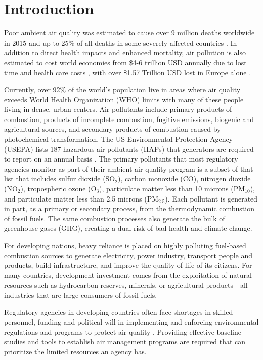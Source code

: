 \chapter{Introduction}

Poor ambient air quality was estimated to cause over 9 million deaths worldwide in 2015 and up to 25\% of all deaths in some severely affected countries \citep{Landrigan2017}. In addition to direct health impacts and enhanced mortality, air pollution is also estimated to cost world economies from \$4-6 trillion USD annually due to lost time and health care costs \citep{Landrigan2017, Narain2016}, with over \$1.57 Trillion USD lost in Europe alone \citep{Roy2015}.

Currently, over 92\% of the world's population live in areas where air quality exceeds World Health Organization (WHO) limits \citep{WHO2016} with many of these people living in dense, urban centers. Air pollutants include primary products of combustion, products of incomplete combustion, fugitive emissions, biogenic and agricultural sources, and secondary products of combustion caused by photochemical transformation. The US Environmental Protection Agency (USEPA) lists 187 hazardous air pollutants (HAPs) that generators are required to report on an annual basis \citep{USEPA2017}. The primary pollutants that most regulatory agencies monitor as part of their ambient air quality program is a subset of that list that includes sulfur dioxide (SO$_{2}$), carbon monoxide (CO), nitrogen dioxide (NO$_{2}$), tropospheric ozone (O$_{3}$),  particulate matter less than 10 microns (PM$_{10}$), and particulate matter less than 2.5 microns (PM$_{2.5}$). Each pollutant is generated in part, as a primary or secondary process, from the thermodynamic combustion of fossil fuels. The same combustion processes also generate the bulk of greenhouse gases (GHG), creating a dual risk of bad health and climate change.

For developing nations, heavy reliance is placed on highly polluting fuel-based combustion sources to generate electricity, power industry, transport people and products, build infrastructure, and improve the quality of life of its citizens. For many countries, development investment comes from the exploitation of natural resources such as hydrocarbon reserves, minerals, or agricultural products - all industries that are large consumers of fossil fuels.

Regulatory agencies in developing countries often face shortages in skilled personnel, funding and political will in implementing and enforcing environmental regulations and programs to protect air quality \citep{Freeman2015a}. Providing effective baseline studies and tools to establish air management programs are required that can prioritize the limited resources an agency has. 

